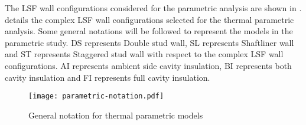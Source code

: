 The LSF wall configurations considered for the parametric analysis are shown in .  details the complex LSF wall configurations selected for the thermal parametric analysis. Some general notations will be followed to represent the models in the parametric study. DS represents Double stud wall, SL represents Shaftliner wall and ST represents Staggered stud wall with respect to the complex LSF wall configurations. AI represents ambient side cavity insulation, BI represents both cavity insulation and FI represents full cavity insulation.    
\begin{figure}[!htbp]
	\centering
	\texttt{[image: parametric-notation.pdf]}
	\caption{General notation for thermal parametric models}
	\label{parametric-notation}
\end{figure}
